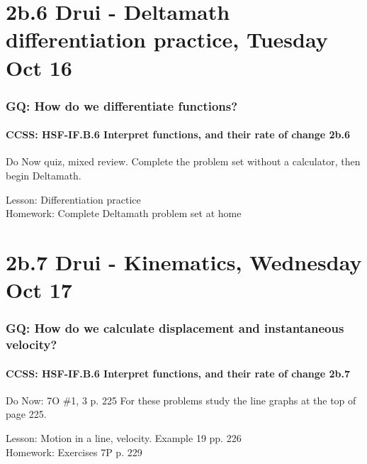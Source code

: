 \documentclass{beamer}
\begin{document}
\section{2b.6 Drui - Deltamath differentiation practice, Tuesday Oct 16}
  \frame
  {
    \frametitle{GQ: How do we differentiate functions?}
    \framesubtitle{CCSS: HSF-IF.B.6 Interpret functions, and their rate of change  \alert{2b.6}}

    \begin{block}{Do Now quiz, mixed review.}
      Complete the problem set without a calculator, then begin Deltamath.
    \end{block} \bigskip

    Lesson: Differentiation practice \\ \bigskip
    Homework: Complete Deltamath problem set at home
  }

\section{2b.7 Drui - Kinematics, Wednesday Oct 17}
  \frame
  {
    \frametitle{GQ: How do we calculate displacement and instantaneous velocity?}
    \framesubtitle{CCSS: HSF-IF.B.6 Interpret functions, and their rate of change  \alert{2b.7}}

    \begin{block}{Do Now: 7O \#1, 3 p. 225}
      For these problems study the line graphs at the top of page 225.
    \end{block} \bigskip
    Lesson: Motion in a line, velocity. Example 19 pp. 226\\
    \bigskip
    Homework: Exercises 7P p. 229
  }

\end{document}
